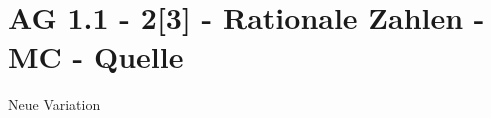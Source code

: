 \section{AG 1.1 - 2[3] - Rationale Zahlen - MC - Quelle}

\begin{beispiel}[AG 1.1]{1}
Neue Variation
\end{beispiel}